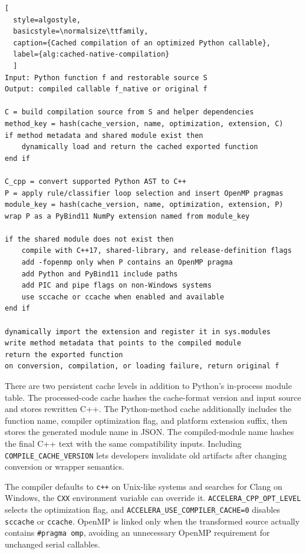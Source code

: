 \documentclass[12pt,a4paper,oneside]{report}
\begin{document}
\noindent\begin{minipage}{\textwidth}
\begin{lstlisting}[
  style=algostyle,
  basicstyle=\normalsize\ttfamily,
  caption={Cached compilation of an optimized Python callable},
  label={alg:cached-native-compilation}
  ]
Input: Python function f and restorable source S
Output: compiled callable f_native or original f

C = build compilation source from S and helper dependencies
method_key = hash(cache_version, name, optimization, extension, C)
if method metadata and shared module exist then
    dynamically load and return the cached exported function
end if

C_cpp = convert supported Python AST to C++
P = apply rule/classifier loop selection and insert OpenMP pragmas
module_key = hash(cache_version, name, optimization, extension, P)
wrap P as a PyBind11 NumPy extension named from module_key

if the shared module does not exist then
    compile with C++17, shared-library, and release-definition flags
    add -fopenmp only when P contains an OpenMP pragma
    add Python and PyBind11 include paths
    add PIC and pipe flags on non-Windows systems
    use sccache or ccache when enabled and available
end if

dynamically import the extension and register it in sys.modules
write method metadata that points to the compiled module
return the exported function
on conversion, compilation, or loading failure, return original f
\end{lstlisting}
\end{minipage}

There are two persistent cache levels in addition to Python's in-process module
table. The processed-code cache hashes the cache-format version and input source
and stores rewritten C++. The Python-method cache additionally includes the
function name, compiler optimization flag, and platform extension suffix, then
stores the generated module name in JSON. The compiled-module name hashes the
final C++ text with the same compatibility inputs. Including
\texttt{COMPILE\_CACHE\_VERSION} lets developers invalidate old artifacts after
changing conversion or wrapper semantics.

The compiler defaults to \texttt{c++} on Unix-like systems and searches for
Clang on Windows, the \texttt{CXX} environment variable can override it.
\texttt{ACCELERA\_CPP\_OPT\_LEVEL} selects the optimization flag, and
\texttt{ACCELERA\_USE\_COMPILER\_CACHE=0} disables \texttt{sccache} or
\texttt{ccache}. OpenMP is linked only when the transformed source actually
contains \texttt{\#pragma omp}, avoiding an unnecessary OpenMP requirement for
unchanged serial callables.
\end{document}
